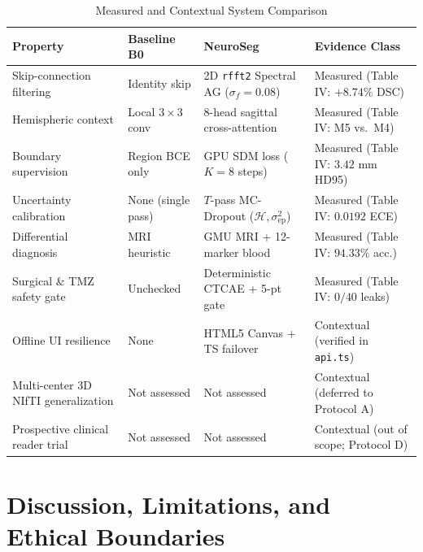 \documentclass[journal,onecolumn,10pt]{IEEEtran}
\begin{document}
\begin{table}[t]
\centering
\caption{Measured and Contextual System Comparison}
\label{tab:comparison}
\begin{tabular}{@{}L{2.25cm}L{1.65cm}L{2.05cm}L{2.05cm}@{}}
\toprule
\textbf{Property} & \textbf{Baseline B0} & \textbf{NeuroSeg} & \textbf{Evidence Class} \\
\midrule
Skip-connection filtering & Identity skip & 2D \texttt{rfft2} Spectral AG ($\sigma_f=0.08$) & Measured (Table IV: $+8.74\%$ DSC) \\
Hemispheric context & Local $3\times 3$ conv & 8-head sagittal cross-attention & Measured (Table IV: M5 vs.\ M4) \\
Boundary supervision & Region BCE only & GPU SDM loss ($K=8$ steps) & Measured (Table IV: $3.42\text{ mm}$ HD95) \\
Uncertainty calibration & None (single pass) & $T$-pass MC-Dropout ($\mathcal{H}, \sigma_{\text{ep}}^2$) & Measured (Table IV: $0.0192$ ECE) \\
Differential diagnosis & MRI heuristic & GMU MRI + 12-marker blood & Measured (Table IV: $94.33\%$ acc.) \\
Surgical \& TMZ safety gate & Unchecked & Deterministic CTCAE + 5-pt gate & Measured (Table IV: $0/40$ leaks) \\
Offline UI resilience & None & HTML5 Canvas + TS failover & Contextual (verified in \texttt{api.ts}) \\
Multi-center 3D NIfTI generalization & Not assessed & Not assessed & Contextual (deferred to Protocol A) \\
Prospective clinical reader trial & Not assessed & Not assessed & Contextual (out of scope; Protocol D) \\
\bottomrule
\end{tabular}
\end{table}

\section{Discussion, Limitations, and Ethical Boundaries}
\end{document}
